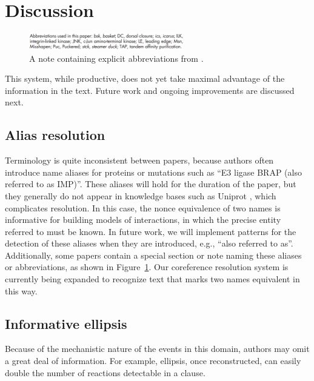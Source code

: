 \section{Discussion}

\begin{figure}[!htbp]
\center
\includegraphics[width=0.6\textwidth]{alias}
\caption{A note containing explicit abbreviations from .}\label{fig:aliases}
\end{figure}

This system, while productive, does not yet take maximal advantage of the information in the text. Future work and ongoing improvements are discussed next.

\subsection{Alias resolution}

Terminology is quite inconsistent between papers, because authors  often introduce name aliases for proteins or mutations such as ``E3 ligase BRAP (also referred to as IMP)''. These aliases will hold for the duration of the paper, but they generally do not appear in knowledge bases such as Uniprot \cite{uniprot}, which complicates resolution. In this case, the nonce equivalence of two names is informative for building models of interactions, in which the precise entity referred to must be known. In future work, we will implement patterns for the detection of these aliases when they are introduced, e.g., ``also referred to as''. Additionally, some papers contain a special section or note naming these aliases or abbreviations, as shown in Figure~\ref{fig:aliases}. Our coreference resolution system is currently being expanded to recognize text that marks two names equivalent in this way. 


\subsection{Informative ellipsis}

Because of the mechanistic nature of the events in this domain, authors may omit a great deal of information. For 
example, ellipsis, once reconstructed, can easily double the number of reactions detectable in a clause.


